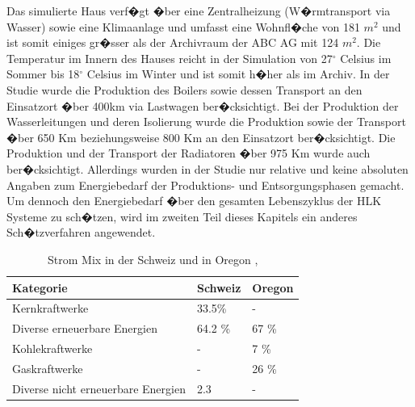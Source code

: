 \documentclass[a4paper,twoside,10pt]{report}
\begin{document}
Das simulierte Haus verf�gt �ber eine Zentralheizung (W�rmtransport via Wasser) sowie eine Klimaanlage und umfasst eine Wohnfl�che von 181 $m^2$ und ist somit einiges gr�sser als der Archivraum der ABC AG mit 124 $m^2$. Die Temperatur im Innern des Hauses reicht in der Simulation von 27$^{\circ}$ Celsius im Sommer bis 18$^{\circ}$ Celsius im Winter und ist somit h�her als im Archiv. In der Studie wurde die Produktion des Boilers sowie dessen Transport an den Einsatzort �ber 400km via Lastwagen ber�cksichtigt. Bei der Produktion der Wasserleitungen und deren Isolierung wurde die Produktion sowie der Transport �ber 650 Km beziehungsweise 800 Km an den Einsatzort ber�cksichtigt. Die Produktion und der Transport der Radiatoren �ber 975 Km wurde auch ber�cksichtigt. Allerdings wurden in der Studie nur relative und keine absoluten Angaben zum Energiebedarf der Produktions- und Entsorgungsphasen gemacht. Um dennoch den Energiebedarf �ber den gesamten Lebenszyklus der \ac{HLK} Systeme zu sch�tzen, wird im zweiten Teil dieses Kapitels ein anderes Sch�tzverfahren angewendet.

\begin{table} [htb]
	\begin{tabular}{l|ll}
	\hline
	\textbf{Kategorie} & \textbf{Schweiz} & \textbf{Oregon} \\
	\hline
	Kernkraftwerke & 33.5\%  & - \\
	Diverse erneuerbare Energien & 64.2 \% & 67 \% \\
	Kohlekraftwerke & - & 7 \% \\
	Gaskraftwerke & - & 26 \% \\
	Diverse nicht erneuerbare Energien & 2.3 & - \\
	\hline
	\end{tabular}
\caption{Strom Mix in der Schweiz und in Oregon \cite{ch_strom}, \cite{hvac_1}} 
\label{tab:mix}
\end{table}
\end{document}
